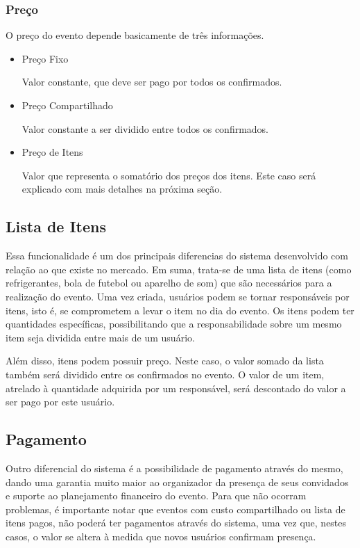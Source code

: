 \subsubsection{Preço}
O preço do evento depende basicamente de três informações.

\begin{itemize}
\item Preço Fixo

Valor constante, que deve ser pago por todos os confirmados.

\item Preço Compartilhado

Valor constante a ser dividido entre todos os confirmados.

\item Preço de Itens

Valor que representa o somatório dos preços dos itens. Este caso será explicado com mais detalhes na próxima seção.
\end{itemize}

\subsection{Lista de Itens}

Essa funcionalidade é um dos principais diferencias do sistema desenvolvido com relação ao que existe no mercado. Em suma, trata-se de uma lista de itens (como refrigerantes, bola de futebol ou aparelho de som)  que são necessários para a realização do evento. Uma vez criada, usuários podem se tornar responsáveis por itens, isto é, se comprometem a levar o item no dia do evento. Os itens podem ter quantidades específicas, possibilitando que a responsabilidade sobre um mesmo item seja dividida entre mais de um usuário.

Além disso, itens podem possuir preço. Neste caso, o valor somado da lista também será dividido entre os confirmados no evento. O valor de um item, atrelado à quantidade adquirida por um responsável, será descontado do valor a ser pago por este usuário.

\subsection{Pagamento}

Outro diferencial do sistema é a possibilidade de pagamento através do mesmo, dando uma garantia muito maior ao organizador da presença de seus convidados e suporte ao planejamento financeiro do evento. Para que não ocorram problemas, é importante notar que eventos com custo compartilhado ou lista de itens pagos, não poderá ter pagamentos através do sistema, uma vez que, nestes casos, o valor se altera à medida que novos usuários confirmam presença.

